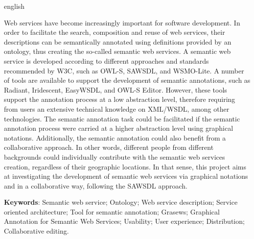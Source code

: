\begin{resumo}[Abstract]
\begin{otherlanguage*}{english}
    
    Web services have become increasingly important for software development. In order to facilitate the search,  composition and reuse of web services, their descriptions can be semantically annotated using definitions provided by an ontology, thus creating the so-called semantic web services. A semantic web service is developed according to different approaches and standards recommended by W3C, such as OWL-S, SAWSDL, and WSMO-Lite. A number of tools are available to support the development of semantic annotations, such as Radiant, Iridescent, EasyWSDL, and OWL-S Editor. However, these tools support the annotation process at a low abstraction level, therefore requiring from users an extensive technical knowledge on XML/WSDL, among other technologies. The semantic annotation task could be facilitated if the semantic annotation process were carried at a higher abstraction level using graphical notations. Additionally, the semantic annotation could also benefit from a collaborative approach. In other words, different people from different backgrounds could individually contribute with the semantic web services creation, regardless of their geographic locations. In that sense, this project aims at investigating the development of semantic web services via graphical notations and in a collaborative way, following the SAWSDL approach.

   \vspace{\onelineskip}
 
   \noindent \textbf{Keywords}: Semantic web service; Ontology; Web service description; Service oriented architecture; Tool for semantic annotation; Grasews; Graphical Annotation for Semantic Web Services; Usability; User experience; Distribution; Collaborative editing.
 \end{otherlanguage*}
\end{resumo}